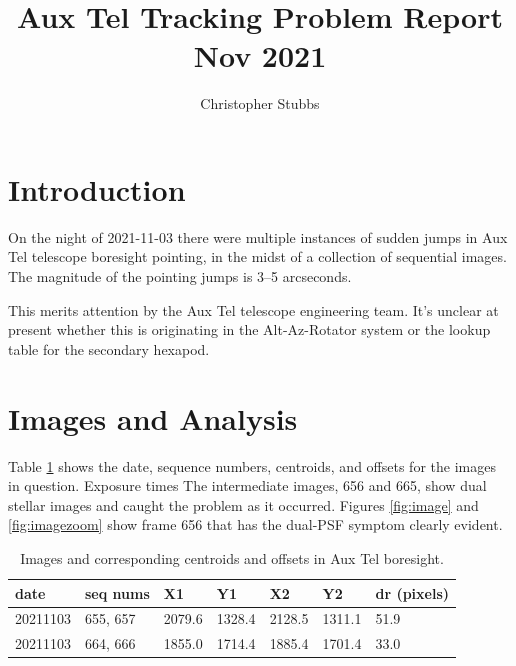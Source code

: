 \documentclass[SE,authoryear,toc]{lsstdoc}
\title{Aux Tel Tracking Problem Report Nov 2021}
\author{%
Christopher Stubbs
}
\date{\vcsDate}
\begin{document}
\maketitle



\section{Introduction}

On the night of 2021-11-03 there were multiple instances of sudden jumps in Aux Tel telescope boresight pointing, in the midst of a collection of sequential images. The magnitude of the pointing jumps is 3--5  arcseconds. 

This merits attention by the Aux Tel telescope engineering team. It's unclear at present whether this is originating in the Alt-Az-Rotator system or the lookup table for the secondary hexapod. 

\section{Images and Analysis}

Table \ref{tab:table} shows the date, sequence numbers, centroids, and offsets for the images in question. Exposure times The intermediate images, 656 and 665, show dual stellar images and caught the problem as it occurred. Figures \ref{fig:image} and \ref{fig:imagezoom} show frame 656 that has the dual-PSF symptom clearly evident. 

\begin{table}[]
    \centering
    \begin{tabular}{|l|l|l|l|l|l|l|}
    \hline
    date & seq nums & X1 & Y1 & X2 & Y2 & dr (pixels) \\
    \hline
    20211103     & 655, 657 & 2079.6 & 1328.4 & 2128.5 & 1311.1 & 51.9\\
    20211103     & 664, 666 & 1855.0 & 1714.4 & 1885.4 & 1701.4 & 33.0 \\
    \hline
    \end{tabular}
    \caption{Images and corresponding centroids and offsets in Aux Tel boresight. }
    \label{tab:table}
\end{table}
\end{document}
